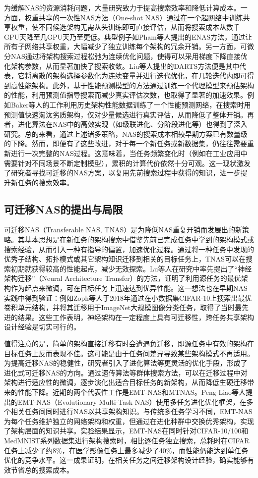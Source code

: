 \documentclass[../main.tex]{subfiles}
\begin{document}
为缓解NAS的资源消耗问题，大量研究致力于提高搜索效率和降低计算成本。一方面，权重共享的一次性NAS方法（One-shot NAS）通过在一个超网络中训练共享权重，使不同候选架构无需从头训练即可直接评估，从而将搜索成本从数千GPU天降至几GPU天乃至更低。典型例子如Pham等人提出的ENAS方法，通过让所有子网络共享权重，大幅减少了独立训练每个架构的冗余开销。另一方面，可微分NAS通过将架构搜索过程松弛为连续优化问题，使得可以采用梯度下降直接优化架构参数，从而显著加快了搜索收敛。Liu等人提出的DARTS方法便是其中代表，它将离散的架构选择参数化为连续变量并进行迭代优化，在几轮迭代内即可得到高性能架构。此外，基于性能预测模型的方法通过训练一个代理模型来预估架构的性能，利用预测值指导搜索而减少真实评估次数，也取得了显著的加速效果。例如Baker等人的工作利用历史架构性能数据训练了一个性能预测网络，在搜索时用预测值快速淘汰劣质架构，仅对少量候选进行真实评估，从而降低了整体开销。再者，进化算法在NAS中的高效实现（如级联进化、分阶段进化等）也得到了深入研究。总的来看，通过上述诸多策略，NAS的搜索成本相较早期方案已有数量级的下降。然而，即便有了这些改进，对于每一个新任务或新数据集，仍往往需要重新进行一次完整的NAS过程。这意味着，当任务频繁变化时（例如在工业应用中需要针对不同场景不断定制模型），累积的计算代价依然十分可观。这一现状激发了研究者寻找可迁移的NAS方案，以复用先前搜索过程中获得的知识，进一步提升新任务的搜索效率。

\subsection{可迁移NAS的提出与局限}

可迁移NAS（Transferable NAS, TNAS）是为降低NAS重复开销而发展出的新策略。其基本思想是在新任务的架构搜索中借鉴先前已完成任务中学到的架构模式或搜索经验，从而引入一种有指导的偏置，加速优化过程。通过将一种任务中发现的优秀子结构、拓扑模式或其它架构知识迁移到相关的目标任务上，TNAS可以在搜索初期就获得较高的性能起点，减少无效探索。Lu等人在研究中率先提出了“神经架构迁移”（Neural Architecture Transfer）的方法，证明了利用源任务的最优架构作为起点来微调，可在目标任务上迅速达到优异性能。这一想法也在早期NAS实践中得到验证：例如Zoph等人于2018年通过在小数据集CIFAR-10上搜索出最优卷积单元结构，并将其迁移用于ImageNet大规模图像分类任务，取得了当时最先进的结果。这些工作表明，神经架构在一定程度上具有可迁移性，跨任务共享架构设计经验是切实可行的。

值得注意的是，简单的架构直接迁移有时会遭遇负迁移，即源任务中有效的架构在目标任务上反而表现不佳。这可能是由于任务间差异导致某些架构模式不再适用。为提高迁移NAS的稳健性，研究者引入了进化算法等更灵活的优化手段，形成了进化式可迁移NAS的方向。通过遗传算法等群体搜索方法，可以在迁移过程中对架构进行适应性的微调，逐步演化出适合目标任务的新架构，从而降低生硬迁移带来的性能下降。近期的两个代表性工作是EMT-NAS和MTNAS。Peng Liao等人提出的EMT-NAS（Evolutionary Multi-Task NAS）使用多任务进化优化框架，在多个相关任务间同时进行NAS以共享架构知识。与传统多任务学习不同，EMT-NAS为每个任务维护独立的网络架构和权重，但通过在进化种群中交换优秀架构，实现了架构层面的知识共享。实验结果显示，EMT-NAS在同时针对CIFAR-10/100和MedMNIST系列数据集进行架构搜索时，相比逐任务独立搜索，总耗时在CIFAR任务上减少了约8\%，在医学影像任务上最多减少了40\%，而性能仍能达到单任务优化的竞争水平。这一成果证明，在相关任务之间迁移架构设计经验，确实能够有效节省总的搜索成本。
\end{document}
